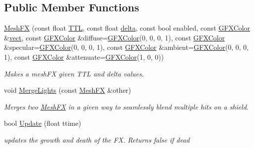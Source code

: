 \subsection*{Public Member Functions}
\begin{DoxyCompactItemize}
\item 
\hyperlink{classMeshFX_ac30f7d36d47e48a75b7c3aecf3429897}{Mesh\+FX} (const float \hyperlink{classMeshFX_a9b23656f04e276cc9cb03018d2238f78}{T\+TL}, const float \hyperlink{classMeshFX_ac1d051b39f8f4a3ae09484c75bf69a3c}{delta}, const bool enabled, const \hyperlink{structGFXColor}{G\+F\+X\+Color} \&\hyperlink{classGFXLight_a334e846aa90e15b6bf371f6fed258134}{vect}, const \hyperlink{structGFXColor}{G\+F\+X\+Color} \&diffuse=\hyperlink{structGFXColor}{G\+F\+X\+Color}(0, 0, 0, 1), const \hyperlink{structGFXColor}{G\+F\+X\+Color} \&specular=\hyperlink{structGFXColor}{G\+F\+X\+Color}(0, 0, 0, 1), const \hyperlink{structGFXColor}{G\+F\+X\+Color} \&ambient=\hyperlink{structGFXColor}{G\+F\+X\+Color}(0, 0, 0, 1), const \hyperlink{structGFXColor}{G\+F\+X\+Color} \&attenuate=\hyperlink{structGFXColor}{G\+F\+X\+Color}(1, 0, 0))\hypertarget{classMeshFX_ac30f7d36d47e48a75b7c3aecf3429897}{}\label{classMeshFX_ac30f7d36d47e48a75b7c3aecf3429897}

\begin{DoxyCompactList}\small\item\em Makes a mesh\+FX given T\+TL and delta values. \end{DoxyCompactList}\item 
void \hyperlink{classMeshFX_a68327b32b6d5f8c11d62421d5a233fc6}{Merge\+Lights} (const \hyperlink{classMeshFX}{Mesh\+FX} \&other)\hypertarget{classMeshFX_a68327b32b6d5f8c11d62421d5a233fc6}{}\label{classMeshFX_a68327b32b6d5f8c11d62421d5a233fc6}

\begin{DoxyCompactList}\small\item\em Merges two \hyperlink{classMeshFX}{Mesh\+FX} in a given way to seamlessly blend multiple hits on a shield. \end{DoxyCompactList}\item 
bool \hyperlink{classMeshFX_aa6e0a1af71105744f1541a6358f256ef}{Update} (float ttime)\hypertarget{classMeshFX_aa6e0a1af71105744f1541a6358f256ef}{}\label{classMeshFX_aa6e0a1af71105744f1541a6358f256ef}

\begin{DoxyCompactList}\small\item\em updates the growth and death of the FX. Returns false if dead \end{DoxyCompactList}\end{DoxyCompactItemize}
